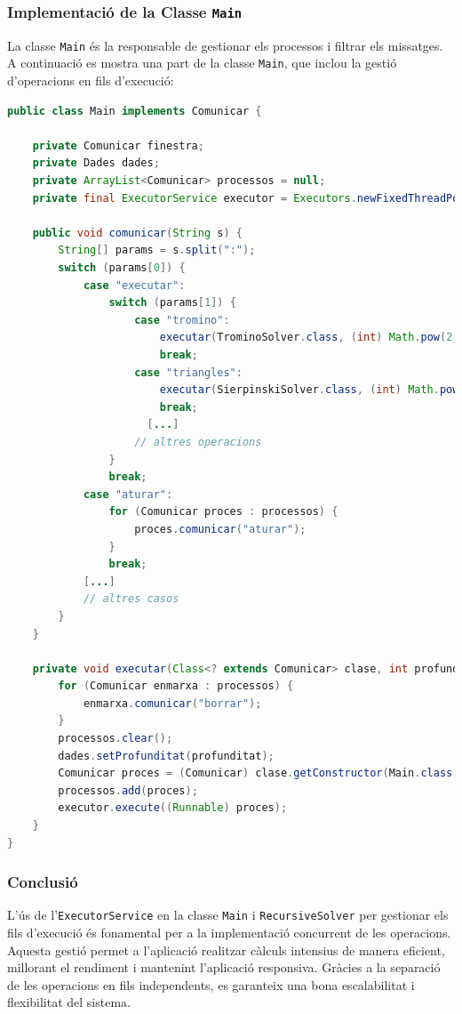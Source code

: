 \documentclass{ieeetj}
\begin{document}
\subsubsection{Implementació de la Classe \texttt{Main}}
La classe \texttt{Main} és la responsable de gestionar els processos i filtrar els missatges. A continuació es mostra una part de la classe \texttt{Main}, que inclou la gestió d'operacions en fils d'execució:

\begin{lstlisting}[language=Java, basicstyle=\ttfamily\small]
public class Main implements Comunicar {

    private Comunicar finestra;
    private Dades dades;
    private ArrayList<Comunicar> processos = null;
    private final ExecutorService executor = Executors.newFixedThreadPool(16);

    public void comunicar(String s) {
        String[] params = s.split(":");
        switch (params[0]) {
            case "executar":
                switch (params[1]) {
                    case "tromino":
                        executar(TrominoSolver.class, (int) Math.pow(2, Integer.parseInt(params[2])));
                        break;
                    case "triangles":
                        executar(SierpinskiSolver.class, (int) Math.pow(2, Integer.parseInt(params[2]) - 1));
                        break;
                      [...]
                    // altres operacions
                }
                break;
            case "aturar":
                for (Comunicar proces : processos) {
                    proces.comunicar("aturar");
                }
                break;
            [...]
            // altres casos
        }
    }

    private void executar(Class<? extends Comunicar> clase, int profunditat) throws NoSuchMethodException, InvocationTargetException, InstantiationException, IllegalAccessException {
        for (Comunicar enmarxa : processos) {
            enmarxa.comunicar("borrar");
        }
        processos.clear();
        dades.setProfunditat(profunditat);
        Comunicar proces = (Comunicar) clase.getConstructor(Main.class, Dades.class).newInstance(this, dades);
        processos.add(proces);
        executor.execute((Runnable) proces);
    }
}
\end{lstlisting}

\subsubsection{Conclusió}
L'ús de l'\texttt{ExecutorService} en la classe \texttt{Main} i \texttt{RecursiveSolver} per gestionar els fils d'execució és fonamental per a la implementació concurrent de les operacions. Aquesta gestió permet a l'aplicació realitzar càlculs intensius de manera eficient, millorant el rendiment i mantenint l'aplicació responsiva. Gràcies a la separació de les operacions en fils independents, es garanteix una bona escalabilitat i flexibilitat del sistema.
\end{document}
